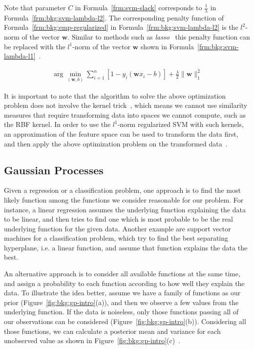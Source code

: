 Note that parameter $C$ in Formula~\ref{frm:svm-slack} corresponds to $\frac{1}{\lambda}$ in Formula~\ref{frm:bkg:svm-lambda-l2}. The corresponding penalty function of Formula~\ref{frm:bkg:emp-regularized} in Formula~\ref{frm:bkg:svm-lambda-l2} is the $l^2$-norm of the vector $\mathbf{w}$. Similar to methods such as \emph{lasso}~\cite[Ch. 3]{statistical-learning} this penalty function can be replaced with the $l^1$-norm of the vector $\mathbf{w}$ shown in Formula~\ref{frm:bkg:svm-lambda-l1}~\cite{zhu20041}.

\begin{align}
  \arg\min_{(\mathbf{w},b)}\sum_{i=1}^{n}[1-y_i(\mathbf{w}x_i - b)] + \frac{\lambda}{2}\|\mathbf{w}\|_1^2
  \label{frm:bkg:svm-lambda-l1}
\end{align}

It is important to note that the algorithm to solve the above optimization problem does not involve the kernel trick~\cite{zhu20041}, which means we cannot use similarity measures that require transforming data into spaces we cannot compute, such as the RBF kernel. In order to use the $l^1$-norm regularized SVM with such kernels, an approximation of the feature space can be used to transform the data first, and then apply the above optimization problem on the transformed data~\cite{rahimi2007random}.

\subsection{Gaussian Processes}
Given a regression or a classification problem, one approach is to find the most likely function among the functions we consider reasonable for our problem. For instance, a linear regression assumes the underlying function explaining the data to be linear, and then tries to find one which is most probable to be the real underlying function for the given data. Another example are support vector machines for a classification problem, which try to find the best separating hyperplane, i.e. a linear function, and assume that function explains the data the best.

An alternative approach is to consider all available functions at the same time, and assign a probability to each function according to how well they explain the data. To illustrate the idea better, assume we have a family of functions as our prior (Figure~\ref{fig:bkg:gp-intro}(a)), and then we observe a few values from the underlying function. If the data is noiseless, only those functions passing all of our observations can be considered (Figure~\ref{fig:bkg:gp-intro}(b)). Considering all those functions, we can calculate a posterior mean and variance for each unobserved value as shown in Figure~\ref{fig:bkg:gp-intro}(c)~\cite{gaussian-processes}.

